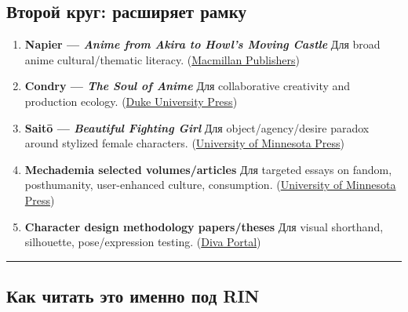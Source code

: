 \subsection*{Второй круг: расширяет рамку}

\begin{enumerate}
\def\labelenumi{\arabic{enumi}.}
\setcounter{enumi}{5}
\item
  \textbf{Napier --- \emph{Anime from Akira to Howl's Moving Castle}}
  Для broad anime cultural/\hspace{0pt}thematic literacy.
  (\href{https://us.macmillan.com/books/9781403970527/animefromakiratohowlsmovingcastle/?utm_source=chatgpt.com}{Macmillan
  Publishers})
\item
  \textbf{Condry --- \emph{The Soul of Anime}} Для collaborative
  creativity and production ecology.
  (\href{https://www.dukeupress.edu/The-Soul-of-Anime/?utm_source=chatgpt.com}{Duke
  University Press})
\item
  \textbf{Saitō --- \emph{Beautiful Fighting Girl}} Для
  object/\hspace{0pt}agency/\hspace{0pt}desire paradox around stylized female characters.
  (\href{https://www.upress.umn.edu/9781452916507/beautiful-fighting-girl/?utm_source=chatgpt.com}{University
  of Minnesota Press})
\item
  \textbf{Mechademia selected volumes/\hspace{0pt}articles} Для targeted essays on
  fandom, posthumanity, user-enhanced culture, consumption.
  (\href{https://www.upress.umn.edu/9781452915654/mechademia-5/?utm_source=chatgpt.com}{University
  of Minnesota Press})
\item
  \textbf{Character design methodology papers/\hspace{0pt}theses} Для visual
  shorthand, silhouette, pose/\hspace{0pt}expression testing.
  (\href{https://www.diva-portal.org/smash/get/diva2\%3A1981591/FULLTEXT01.pdf?utm_source=chatgpt.com}{Diva
  Portal})
\end{enumerate}

\begin{center}\rule{0.5\linewidth}{0.5pt}\end{center}

\subsection*{Как читать это именно под RIN}

